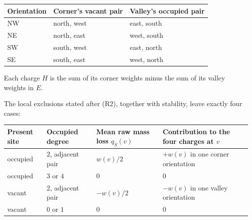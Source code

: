 \documentclass[
  11pt,
  a4paper,
]{article}
\begin{document}
\begin{longtable}[]{@{}lll@{}}
\toprule\noalign{}
Orientation & Corner's vacant pair & Valley's occupied pair \\
\midrule\noalign{}
\endhead
\bottomrule\noalign{}
\endlastfoot
NW & north, west & east, south \\
NE & north, east & west, south \\
SW & south, west & east, north \\
SE & south, east & west, north \\
\end{longtable}

Each charge \(H\) is the sum of its corner weights minus the sum of its
valley weights in \(E\).

The local exclusions stated after (R2), together with stability, leave
exactly four cases:

\begin{longtable}[]{@{}
  >{\raggedright\arraybackslash}p{}
  >{\raggedright\arraybackslash}p{}
  >{\raggedright\arraybackslash}p{}
  >{\raggedright\arraybackslash}p{}@{}}
\toprule\noalign{}
\begin{minipage}[b]{\linewidth}\raggedright
Present site
\end{minipage} & \begin{minipage}[b]{\linewidth}\raggedright
Occupied degree
\end{minipage} & \begin{minipage}[b]{\linewidth}\raggedright
Mean raw mass loss \(q_S(v)\)
\end{minipage} & \begin{minipage}[b]{\linewidth}\raggedright
Contribution to the four charges at \(v\)
\end{minipage} \\
\midrule\noalign{}
\endhead
\bottomrule\noalign{}
\endlastfoot
occupied & \(2\), adjacent pair & \(w(v)/2\) & \(+w(v)\) in one corner
orientation \\
occupied & \(3\) or \(4\) & \(0\) & \(0\) \\
vacant & \(2\), adjacent pair & \(-w(v)/2\) & \(-w(v)\) in one valley
orientation \\
vacant & \(0\) or \(1\) & \(0\) & \(0\) \\
\end{longtable}
\end{document}

